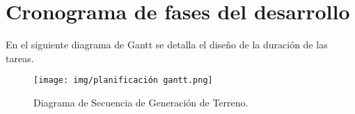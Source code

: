 \section{Cronograma de fases del desarrollo}

En el siguiente diagrama de Gantt se detalla el diseño de la duración de las tareas.

\begin{figure}[H]
    \centering
    \texttt{[image: img/planificación gantt.png]}
    \caption{Diagrama de Secuencia de Generación de Terreno.}
\end{figure}
